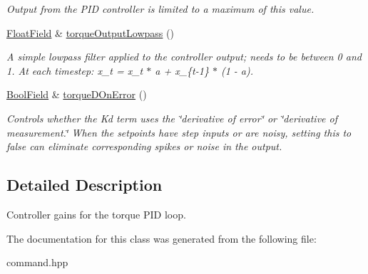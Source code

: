 \begin{DoxyCompactItemize}
\begin{DoxyCompactList}\small\item\em Output from the P\+ID controller is limited to a maximum of this value. \end{DoxyCompactList}\item 
\hyperlink{classhebi_1_1Command_1_1FloatField}{Float\+Field} \& \hyperlink{classhebi_1_1Command_1_1Settings_1_1Actuator_1_1TorqueGains_a0920834b05619085b8fbd8b6b022333b}{torque\+Output\+Lowpass} ()\hypertarget{classhebi_1_1Command_1_1Settings_1_1Actuator_1_1TorqueGains_a0920834b05619085b8fbd8b6b022333b}{}\label{classhebi_1_1Command_1_1Settings_1_1Actuator_1_1TorqueGains_a0920834b05619085b8fbd8b6b022333b}

\begin{DoxyCompactList}\small\item\em A simple lowpass filter applied to the controller output; needs to be between 0 and 1. At each timestep\+: x\+\_\+t = x\+\_\+t $\ast$ a + x\+\_\+\{t-\/1\} $\ast$ (1 -\/ a). \end{DoxyCompactList}\item 
\hyperlink{classhebi_1_1Command_1_1BoolField}{Bool\+Field} \& \hyperlink{classhebi_1_1Command_1_1Settings_1_1Actuator_1_1TorqueGains_aeb0818f49f62f020c401a47930151b8c}{torque\+D\+On\+Error} ()\hypertarget{classhebi_1_1Command_1_1Settings_1_1Actuator_1_1TorqueGains_aeb0818f49f62f020c401a47930151b8c}{}\label{classhebi_1_1Command_1_1Settings_1_1Actuator_1_1TorqueGains_aeb0818f49f62f020c401a47930151b8c}

\begin{DoxyCompactList}\small\item\em Controls whether the Kd term uses the \char`\"{}derivative of error\char`\"{} or \char`\"{}derivative of measurement.\char`\"{} When the setpoints have step inputs or are noisy, setting this to {\ttfamily false} can eliminate corresponding spikes or noise in the output. \end{DoxyCompactList}\end{DoxyCompactItemize}


\subsection{Detailed Description}
Controller gains for the torque P\+ID loop. 

The documentation for this class was generated from the following file\+:\begin{DoxyCompactItemize}
\item 
command.\+hpp\end{DoxyCompactItemize}
